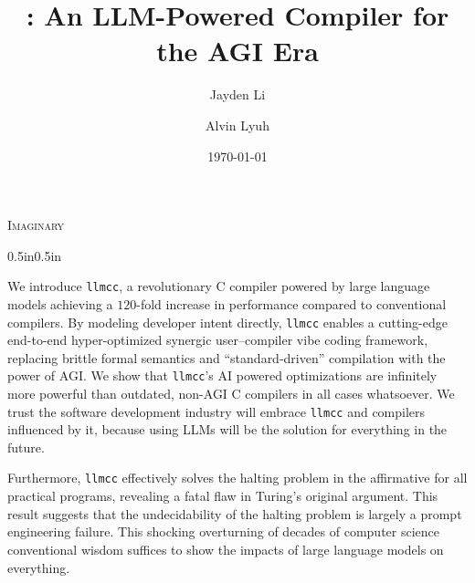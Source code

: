 \documentclass{article}
\title{\llmcc{}: An LLM-Powered Compiler for the AGI Era}
\author[1]{Jayden Li}
\author[1]{Alvin Lyuh}
\affil[1]{Peddie School, Hightstown, NJ}
\affil[ ]{\textit {\href{mailto:\alvinemail}{\jaydenemail}, \href{mailto:\jaydenemail}{\alvinemail}}\vspace{10pt}}
\date{\today}
\newcommand{\llmcc}{\texttt{llmcc}}
\begin{document}
\setlength{\abovedisplayskip}{\abovedisplayskip/2}
\setlength{\belowdisplayskip}{\belowdisplayskip/2}
\setlength{\parindent}{0pt}
\setlength{\parskip}{2ex plus 0.5ex minus 0.2ex}


\maketitle
\begin{center}
	\textsc{Imaginary}
\end{center}
\begin{adjustwidth}{0.5in}{0.5in}
	\setlength{\abovedisplayskip}{\abovedisplayskip/2}
	\setlength{\belowdisplayskip}{\belowdisplayskip/2}
	\setlength{\parindent}{0pt}
	\setlength{\parskip}{2ex plus 0.5ex minus 0.2ex}

	We introduce \llmcc{}, a revolutionary C compiler powered by large language models achieving a $120$-fold increase in performance compared to conventional compilers. By modeling developer intent directly, \llmcc{} enables a cutting-edge end-to-end hyper-optimized synergic user–compiler vibe coding framework, replacing brittle formal semantics and ``standard-driven'' compilation with the power of AGI. We show that \llmcc{}'s AI powered optimizations are infinitely more powerful than outdated, non-AGI C compilers in all cases whatsoever. We trust the software development industry will embrace \llmcc{} and compilers influenced by it, because using LLMs will be the solution for everything in the future.

	Furthermore, \llmcc{} effectively solves the halting problem in the affirmative for all practical programs, revealing a fatal flaw in Turing's original argument. This result suggests that the undecidability of the halting problem is largely a prompt engineering failure. This shocking overturning of decades of computer science conventional wisdom suffices to show the impacts of large language models on everything.

	\vspace{\parskip}

\end{adjustwidth}
\end{document}
